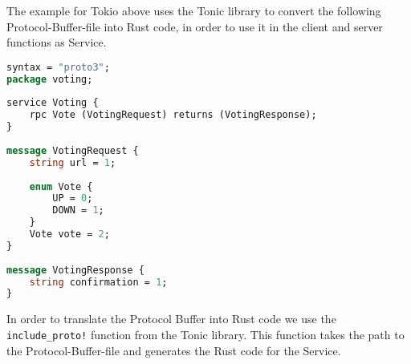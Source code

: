 The example for Tokio above uses the Tonic library to convert the following Protocol-Buffer-file into Rust code, in order to use it in the client and server 
functions as Service.

\begin{minipage}{\textwidth}
\begin{lstlisting}[language=ProtoBuf]
syntax = "proto3";
package voting;
        
service Voting {
    rpc Vote (VotingRequest) returns (VotingResponse);
}
        
message VotingRequest {
    string url = 1;
        
    enum Vote {
        UP = 0;
        DOWN = 1;
    }
    Vote vote = 2;    
}
        
message VotingResponse {
    string confirmation = 1;
}
\end{lstlisting}
\end{minipage}

In order to translate the Protocol Buffer into Rust code we use the \verb+include_proto!+ function from the Tonic library. This function takes the path to the 
Protocol-Buffer-file and generates the Rust code for the Service.


\filbreak

